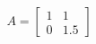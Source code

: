 \documentclass[preview]{standalone}
\begin{document}
\begin{align*}
A = \begin{bmatrix} 1 & 1 \\ 0 & 1.5 \end{bmatrix}
\end{align*}
\end{document}
